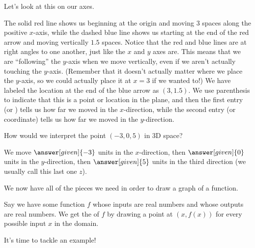 \documentclass{ximera}
\begin{document}
Let's look at this on our axes.
\begin{image}
\end{image}
The solid red line shows us beginning at the origin and moving $3$ spaces along the positive $x$-axis, while the dashed blue line shows us starting at the end of the red arrow and moving vertically $1.5$ spaces. Notice that the red and blue lines are at right angles to one another, just like the $x$ and $y$ axes are. This means that we are ``following'' the $y$-axis when we move vertically, even if we aren't actually touching the $y$-axis. (Remember that it doesn't actually matter where we place the $y$-axis, so we could actually place it at $x=3$ if we wanted to!) We have labeled the location at the end of the blue arrow as $(3, 1.5)$. We use parenthesis to indicate that this is a point or location in the plane, and then the first entry (or ) tells us how far we moved in the $x$-direction, while the second entry (or coordinate) tells us how far we moved in the $y$-direction.

\begin{question}
How would we interpret the point $(-3, 0, 5)$ in 3D space?

We move $\answer[given]{-3}$ units in the $x$-direction, then $\answer[given]{0}$ units in the $y$-direction, then $\answer[given]{5}$ units in the third direction (we usually call this last one $z$).
\end{question}

We now have all of the pieces we need in order to draw a graph of a function.
\begin{definition}
Say we have some function $f$ whose inputs are real numbers and whose outputs are real numbers. We get the  of $f$ by drawing a point at $(x, f(x))$ for every possible input $x$ in the domain.
\end{definition}
It's time to tackle an example!
\end{document}
